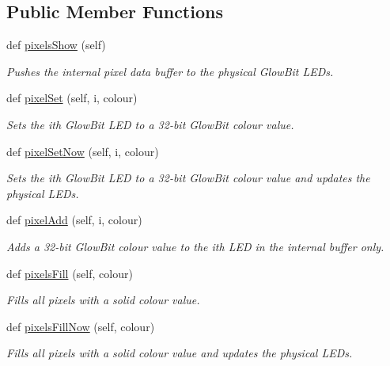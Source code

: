 \subsection*{Public Member Functions}
\begin{DoxyCompactItemize}
\item 
def \hyperlink{classglowbit_1_1glowbit_a051aed2a4969fdcb0466e4e840209279}{pixels\+Show} (self)
\begin{DoxyCompactList}\small\item\em Pushes the internal pixel data buffer to the physical Glow\+Bit L\+E\+Ds. \end{DoxyCompactList}\item 
def \hyperlink{classglowbit_1_1glowbit_a6184de87721652f9f55f9301f6a3a9ce}{pixel\+Set} (self, i, colour)
\begin{DoxyCompactList}\small\item\em Sets the i\textquotesingle{}th Glow\+Bit L\+ED to a 32-\/bit Glow\+Bit colour value. \end{DoxyCompactList}\item 
def \hyperlink{classglowbit_1_1glowbit_a6f4167e566106d5eb104933b256f2e14}{pixel\+Set\+Now} (self, i, colour)
\begin{DoxyCompactList}\small\item\em Sets the i\textquotesingle{}th Glow\+Bit L\+ED to a 32-\/bit Glow\+Bit colour value and updates the physical L\+E\+Ds. \end{DoxyCompactList}\item 
def \hyperlink{classglowbit_1_1glowbit_a8bb7ba36b4b7746f215ebad1acc0f5e2}{pixel\+Add} (self, i, colour)
\begin{DoxyCompactList}\small\item\em Adds a 32-\/bit Glow\+Bit colour value to the i\textquotesingle{}th L\+ED in the internal buffer only. \end{DoxyCompactList}\item 
def \hyperlink{classglowbit_1_1glowbit_aca86823fecc4949692ac18f8c21e34ac}{pixels\+Fill} (self, colour)
\begin{DoxyCompactList}\small\item\em Fills all pixels with a solid colour value. \end{DoxyCompactList}\item 
def \hyperlink{classglowbit_1_1glowbit_a2aae728fcc6e8cdfe5c745ac0a7d308d}{pixels\+Fill\+Now} (self, colour)
\begin{DoxyCompactList}\small\item\em Fills all pixels with a solid colour value and updates the physical L\+E\+Ds. \end{DoxyCompactList}\item 

\end{DoxyCompactItemize}
